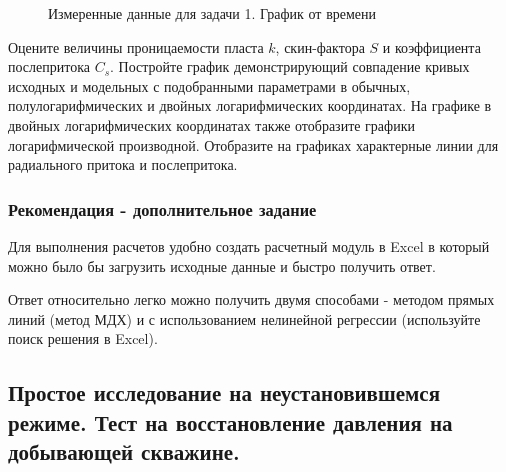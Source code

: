 \begin{figure}[h]
	\caption{Измеренные данные для задачи 1. График от времени}
	\label{ris:test01}		
\end{figure}


Оцените величины проницаемости пласта $k$, скин-фактора $S$ и коэффициента послепритока $C_s$. Постройте график демонстрирующий совпадение кривых исходных и модельных с подобранными параметрами в обычных, полулогарифмических и двойных логарифмических координатах. На графике в двойных логарифмических координатах также отобразите графики логарифмической производной. Отобразите на графиках характерные линии для радиального притока и послепритока.


\subsubsection{Рекомендация - дополнительное задание}

Для выполнения расчетов удобно создать расчетный модуль в Excel в который можно было бы загрузить исходные данные и быстро получить ответ.

Ответ относительно легко можно получить двумя способами - методом прямых линий (метод МДХ) и с использованием нелинейной регрессии (используйте поиск решения в Excel).


\subsection{Простое исследование на неустановившемся режиме. Тест на восстановление давления на добывающей скважине.}

